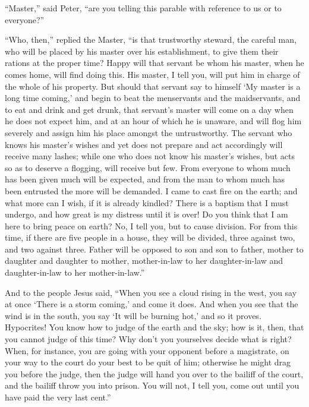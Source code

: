  ``Master,'' said Peter, ``are you telling this parable
with reference to us or to everyone?''

 ``Who, then,'' replied the Master, ``is that trustworthy
steward, the careful man, who will be placed by his master over his
establishment, to give them their rations at the proper time?
 Happy will that servant be whom his master, when he comes
home, will find doing this.  His master, I tell you, will
put him in charge of the whole of his property.  But should
that servant say to himself `My master is a long time coming,' and begin
to beat the menservants and the maidservants, and to eat and drink and
get drunk,  that servant's master will come on a day when
he does not expect him, and at an hour of which he is unaware, and will
flog him severely and assign him his place amongst the untrustworthy.
 The servant who knows his master's wishes and yet does not
prepare and act accordingly will receive many lashes; 
while one who does not know his master's wishes, but acts so as to
deserve a flogging, will receive but few. From everyone to whom much has
been given much will be expected, and from the man to whom much has been
entrusted the more will be demanded.  I came to cast fire
on the earth; and what more can I wish, if it is already kindled?
 There is a baptism that I must undergo, and how great is
my distress until it is over!  Do you think that I am here
to bring peace on earth? No, I tell you, but to cause division.
 For from this time, if there are five people in a house,
they will be divided, three against two, and two against three.
 Father will be opposed to son and son to father, mother to
daughter and daughter to mother, mother-in-law to her daughter-in-law
and daughter-in-law to her mother-in-law.''

 And to the people Jesus said, ``When you see a cloud
rising in the west, you say at once `There is a storm coming,' and come
it does.  And when you see that the wind is in the south,
you say `It will be burning hot,' and so it proves. 
Hypocrites! You know how to judge of the earth and the sky; how is it,
then, that you cannot judge of this time?  Why don't you
yourselves decide what is right?  When, for instance, you
are going with your opponent before a magistrate, on your way to the
court do your best to be quit of him; otherwise he might drag you before
the judge, then the judge will hand you over to the bailiff of the
court, and the bailiff throw you into prison.  You will
not, I tell you, come out until you have paid the very last cent.''

